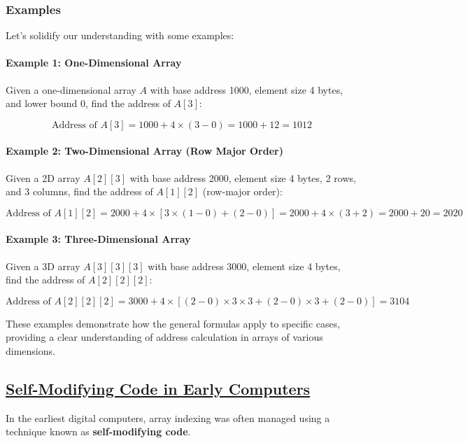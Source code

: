 \documentclass{book}
\begin{document}
\subsubsection{Examples}

Let’s solidify our understanding with some examples:

\paragraph{Example 1: One-Dimensional Array}
Given a one-dimensional array \( A \) with base address 1000, element size 4 bytes, and lower bound 0, find the address of \( A[3] \):

\[
\text{Address of } A[3] = 1000 + 4 \times (3 - 0) = 1000 + 12 = 1012
\]

\paragraph{Example 2: Two-Dimensional Array (Row Major Order)}
Given a 2D array \( A[2][3] \) with base address 2000, element size 4 bytes, 2 rows, and 3 columns, find the address of \( A[1][2] \) (row-major order):

\[
\text{Address of } A[1][2] = 2000 + 4 \times \left[ 3 \times (1 - 0) + (2 - 0) \right] = 2000 + 4 \times (3 + 2) = 2000 + 20 = 2020
\]

\paragraph{Example 3: Three-Dimensional Array}
Given a 3D array \( A[3][3][3] \) with base address 3000, element size 4 bytes, find the address of \( A[2][2][2] \):

\[\text{Address of } A[2][2][2] = 3000 + 4 \times \left[ (2 - 0) \times 3 \times 3 + (2 - 0) \times 3 + (2 - 0) \right] = 3104\]

These examples demonstrate how the general formulas apply to specific cases, providing a clear understanding of address calculation in arrays of various dimensions.


	\subsection{\href{https://en.wikipedia.org/wiki/Self-modifying_code}{Self-Modifying Code in Early Computers}}
	
	In the earliest digital computers, array indexing was often managed using a technique known as \textbf{self-modifying code}.
	
\end{document}

